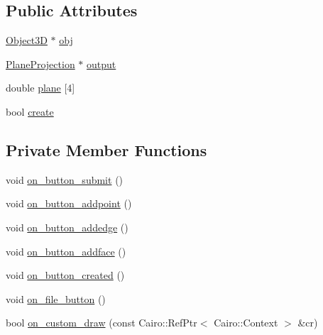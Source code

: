 \subsection*{Public Attributes}
\begin{DoxyCompactItemize}
\item 
\hyperlink{class_object3_d}{Object3D} $\ast$ \hyperlink{class_projection_window_a293d88f62f3e1bfaae618efb908d558f}{obj}
\item 
\hyperlink{class_plane_projection}{Plane\+Projection} $\ast$ \hyperlink{class_projection_window_ab0d78b724ab9b44c72f02de7980091ae}{output}
\item 
double \hyperlink{class_projection_window_aa130209ff4f537cab083939abe684bc4}{plane} \mbox{[}4\mbox{]}
\item 
bool \hyperlink{class_projection_window_a9d2ad475176146e8a5e5f846162b2de5}{create}
\end{DoxyCompactItemize}
\subsection*{Private Member Functions}
\begin{DoxyCompactItemize}
\item 
void \hyperlink{class_projection_window_a63deb52bcb4430a8b69433469a07e86a}{on\+\_\+button\+\_\+submit} ()
\item 
void \hyperlink{class_projection_window_a7c9820a913ddd148340de253f89d597d}{on\+\_\+button\+\_\+addpoint} ()
\item 
void \hyperlink{class_projection_window_acccff48ee21968a09a650530b88b83c7}{on\+\_\+button\+\_\+addedge} ()
\item 
void \hyperlink{class_projection_window_a3205f524a90213beffb9870b8fddd5e7}{on\+\_\+button\+\_\+addface} ()
\item 
void \hyperlink{class_projection_window_a6565002548ab838930bd4fd7b7a8e52e}{on\+\_\+button\+\_\+created} ()
\item 
void \hyperlink{class_projection_window_ad8985e5ffa65b9e4fa4a17a2fc1680a5}{on\+\_\+file\+\_\+button} ()
\item 
bool \hyperlink{class_projection_window_abac0b81445020f55b0bcfaf3a2548492}{on\+\_\+custom\+\_\+draw} (const Cairo\+::\+Ref\+Ptr$<$ Cairo\+::\+Context $>$ \&cr)
\end{DoxyCompactItemize}
